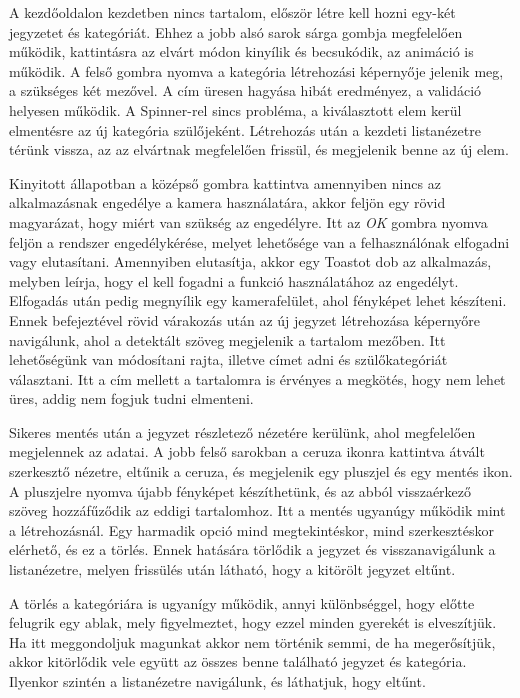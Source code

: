 A kezdőoldalon kezdetben nincs tartalom, először létre kell hozni egy-két jegyzetet és kategóriát. Ehhez a jobb alsó sarok sárga gombja megfelelően működik, kattintásra az elvárt módon kinyílik és becsukódik, az animáció is működik. A felső gombra nyomva a kategória létrehozási képernyője jelenik meg, a szükséges két mezővel. A cím üresen hagyása hibát eredményez, a validáció helyesen működik. A Spinner-rel sincs probléma, a kiválasztott elem kerül elmentésre az új kategória szülőjeként. Létrehozás után a kezdeti listanézetre térünk vissza, az az elvártnak megfelelően frissül, és megjelenik benne az új elem. 

Kinyitott állapotban a középső gombra kattintva amennyiben nincs az alkalmazásnak engedélye a kamera használatára, akkor feljön egy rövid magyarázat, hogy miért van szükség az engedélyre. Itt az \emph{OK} gombra nyomva feljön a rendszer engedélykérése, melyet lehetősége van a felhasználónak elfogadni vagy elutasítani. Amennyiben elutasítja, akkor egy Toastot dob az alkalmazás, melyben leírja, hogy el kell fogadni a funkció használatához az engedélyt. Elfogadás után pedig megnyílik egy kamerafelület, ahol fényképet lehet készíteni. Ennek befejeztével rövid várakozás után az új jegyzet létrehozása képernyőre navigálunk, ahol a detektált szöveg megjelenik a tartalom mezőben. Itt lehetőségünk van módosítani rajta, illetve címet adni és szülőkategóriát választani. Itt a cím mellett a tartalomra is érvényes a megkötés, hogy nem lehet üres, addig nem fogjuk tudni elmenteni. 

Sikeres mentés után a jegyzet részletező nézetére kerülünk, ahol megfelelően megjelennek az adatai. A jobb felső sarokban a ceruza ikonra kattintva átvált szerkesztő nézetre, eltűnik a ceruza, és megjelenik egy pluszjel és egy mentés ikon. A pluszjelre nyomva újabb fényképet készíthetünk, és az abból visszaérkező szöveg hozzáfűződik az eddigi tartalomhoz. Itt a mentés ugyanúgy működik mint a létrehozásnál. Egy harmadik opció mind megtekintéskor, mind szerkesztéskor elérhető, és ez a törlés. Ennek hatására törlődik a jegyzet és visszanavigálunk a listanézetre, melyen frissülés után látható, hogy a kitörölt jegyzet eltűnt. 

A törlés a kategóriára is ugyanígy működik, annyi különbséggel, hogy előtte felugrik egy ablak, mely figyelmeztet, hogy ezzel minden gyerekét is elveszítjük. Ha itt meggondoljuk magunkat akkor nem történik semmi, de ha megerősítjük, akkor kitörlődik vele együtt az összes benne található jegyzet és kategória. Ilyenkor szintén a listanézetre navigálunk, és láthatjuk, hogy eltűnt. 


